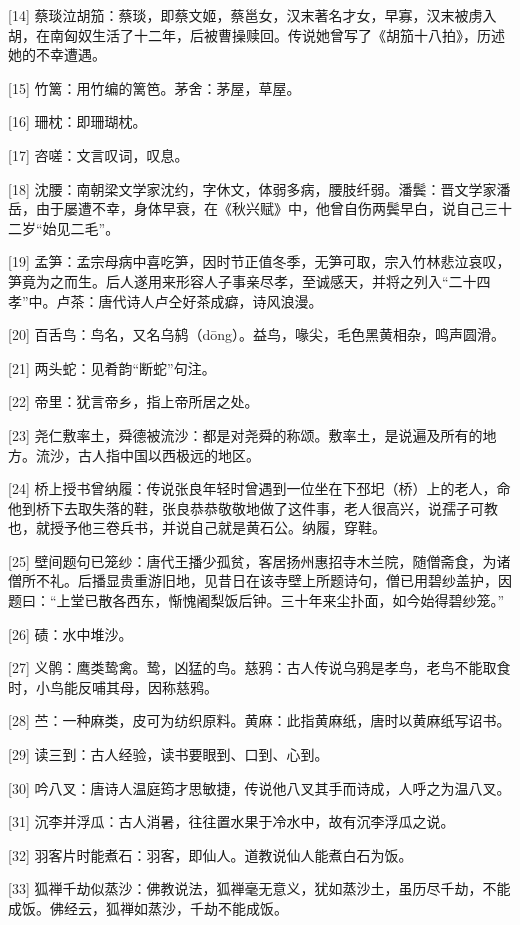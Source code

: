 \documentclass[12pt,UTF8]{ctexbook}
\begin{document}
[14] 蔡琰泣胡笳：蔡琰，即蔡文姬，蔡邕女，汉末著名才女，早寡，汉末被虏入胡，在南匈奴生活了十二年，后被曹操赎回。传说她曾写了《胡笳十八拍》，历述她的不幸遭遇。

[15] 竹篱：用竹编的篱笆。茅舍：茅屋，草屋。

[16] 珊枕：即珊瑚枕。

[17] 咨嗟：文言叹词，叹息。

[18] 沈腰：南朝梁文学家沈约，字休文，体弱多病，腰肢纤弱。潘鬓：晋文学家潘岳，由于屡遭不幸，身体早衰，在《秋兴赋》中，他曾自伤两鬓早白，说自己三十二岁“始见二毛”。

[19] 孟笋：孟宗母病中喜吃笋，因时节正值冬季，无笋可取，宗入竹林悲泣哀叹，笋竟为之而生。后人遂用来形容人子事亲尽孝，至诚感天，并将之列入“二十四孝”中。卢茶：唐代诗人卢仝好茶成癖，诗风浪漫。

[20] 百舌鸟：鸟名，又名乌鸫（dōng）。益鸟，喙尖，毛色黑黄相杂，鸣声圆滑。

[21] 两头蛇：见肴韵“断蛇”句注。

[22] 帝里：犹言帝乡，指上帝所居之处。

[23] 尧仁敷率土，舜德被流沙：都是对尧舜的称颂。敷率土，是说遍及所有的地方。流沙，古人指中国以西极远的地区。

[24] 桥上授书曾纳履：传说张良年轻时曾遇到一位坐在下邳圯（桥）上的老人，命他到桥下去取失落的鞋，张良恭恭敬敬地做了这件事，老人很高兴，说孺子可教也，就授予他三卷兵书，并说自己就是黄石公。纳履，穿鞋。

[25] 壁间题句已笼纱：唐代王播少孤贫，客居扬州惠招寺木兰院，随僧斋食，为诸僧所不礼。后播显贵重游旧地，见昔日在该寺壁上所题诗句，僧已用碧纱盖护，因题曰：“上堂已散各西东，惭愧阇梨饭后钟。三十年来尘扑面，如今始得碧纱笼。”

[26] 碛：水中堆沙。

[27] 义鹘：鹰类鸷禽。鸷，凶猛的鸟。慈鸦：古人传说乌鸦是孝鸟，老鸟不能取食时，小鸟能反哺其母，因称慈鸦。

[28] 苎：一种麻类，皮可为纺织原料。黄麻：此指黄麻纸，唐时以黄麻纸写诏书。

[29] 读三到：古人经验，读书要眼到、口到、心到。

[30] 吟八叉：唐诗人温庭筠才思敏捷，传说他八叉其手而诗成，人呼之为温八叉。

[31] 沉李并浮瓜：古人消暑，往往置水果于冷水中，故有沉李浮瓜之说。

[32] 羽客片时能煮石：羽客，即仙人。道教说仙人能煮白石为饭。

[33] 狐禅千劫似蒸沙：佛教说法，狐禅毫无意义，犹如蒸沙土，虽历尽千劫，不能成饭。佛经云，狐禅如蒸沙，千劫不能成饭。
\end{document}
